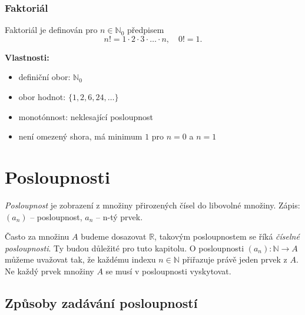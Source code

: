 \documentclass[openany,12pt,a4paper]{book}
\begin{document}
\subsection*{Faktoriál}
\begin{definition}
Faktoriál je definován pro $n \in \mathbb{N}_0$ předpisem
\[
n! = 1 \cdot 2 \cdot 3 \cdot \dots \cdot n, \quad 0! = 1.
\]
\end{definition}

\textbf{Vlastnosti:}
\begin{itemize}
  \item definiční obor: $\mathbb{N}_0$
  \item obor hodnot: $\{1, 2, 6, 24, \dots\}$
  \item monotónnost: neklesající posloupnost
  \item není omezený shora, má minimum $1$ pro $n=0$ a $n=1$
\end{itemize}

\begin{center}
\end{center}


\chapter{Posloupnosti}
\begin{definition}
\emph{Posloupnost} je zobrazení z množiny přirozených čísel do libovolné množiny.
Zápis: $(a_n)$ -- posloupnost, $a_n$ -- n-tý prvek.
\end{definition}

Často za množinu $A$ budeme dosazovat $\mathbb{R}$, takovým posloupnostem se říká \emph{číselné posloupnosti}. Ty budou důležité pro tuto kapitolu. O posloupnosti $(a_n):\mathbb{N} \rightarrow A$ můžeme uvažovat tak, že každému indexu $n \in \mathbb{N}$ přiřazuje právě jeden prvek z $A$. Ne každý prvek množiny $A$ se musí v posloupnosti vyskytovat.

\section{Způsoby zadávání posloupností} 
\end{document}
